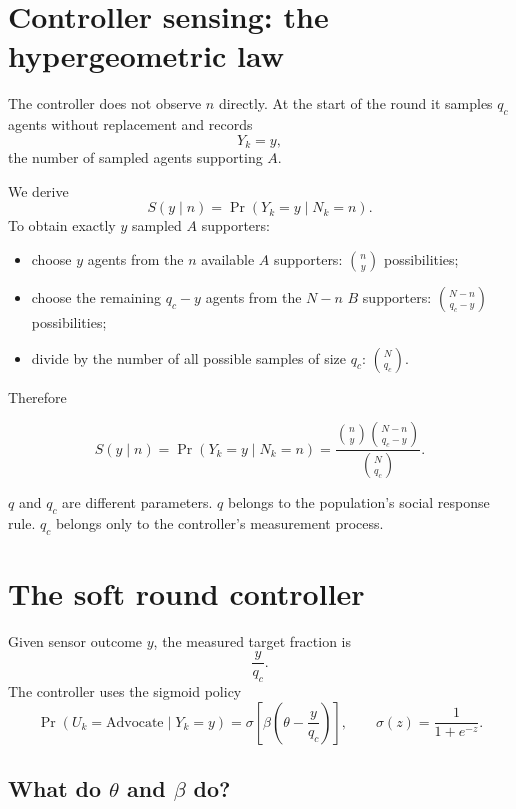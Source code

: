\documentclass[11pt,a4paper]{article}
\newcommand{\Adv}{\ensuremath{\mathrm{Advocate}}}
\newcommand{\Prb}{\operatorname{Pr}}
\newcommand{\1}{\mathbbm{1}}
\begin{document}
\section{Controller sensing: the hypergeometric law}

The controller does not observe $n$ directly. At the start of the round it samples $q_c$ agents without replacement and records
\[
Y_k=y,
\]
the number of sampled agents supporting $A$.

We derive
\[
S(y\mid n)=\Prb(Y_k=y\mid N_k=n).
\]
To obtain exactly $y$ sampled $A$ supporters:
\begin{itemize}[leftmargin=1.5em]
\item choose $y$ agents from the $n$ available $A$ supporters: $\binom{n}{y}$ possibilities;
\item choose the remaining $q_c-y$ agents from the $N-n$ $B$ supporters: $\binom{N-n}{q_c-y}$ possibilities;
\item divide by the number of all possible samples of size $q_c$: $\binom{N}{q_c}$.
\end{itemize}
Therefore
\begin{resultbox}
\begin{equation}
\boxed{
S(y\mid n)
=
\Prb(Y_k=y\mid N_k=n)
=
\frac{\binom{n}{y}\binom{N-n}{q_c-y}}{\binom{N}{q_c}}.}
\label{eq:sensor}
\end{equation}
\end{resultbox}

\begin{warningbox}
$q$ and $q_c$ are different parameters. $q$ belongs to the population's social response rule. $q_c$ belongs only to the controller's measurement process.
\end{warningbox}

\section{The soft round controller}

Given sensor outcome $y$, the measured target fraction is
\[
\frac{y}{q_c}.
\]
The controller uses the sigmoid policy
\begin{equation}
\Prb(U_k=\Adv\mid Y_k=y)
=
\sigma\!\left[\beta\left(\theta-\frac{y}{q_c}\right)\right],
\qquad
\sigma(z)=\frac{1}{1+e^{-z}}.
\label{eq:softpolicy}
\end{equation}

\subsection{What do $\theta$ and $\beta$ do?}
\end{document}
